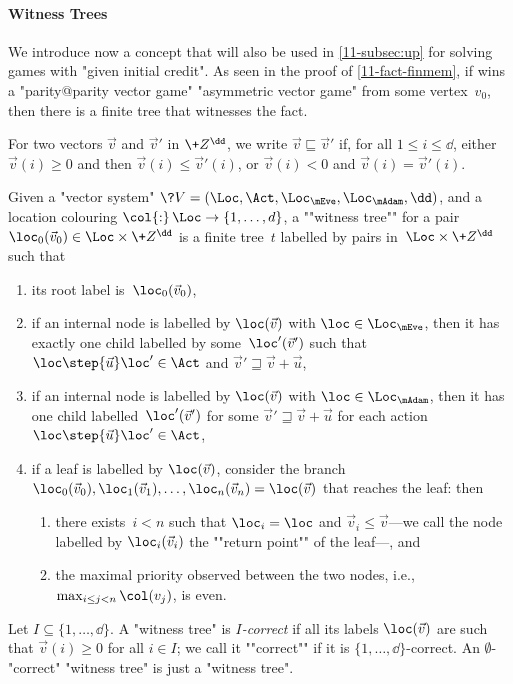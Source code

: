 
\paragraph{Witness Trees}
We introduce now a concept that will also be used in \cref{11-subsec:up}
for solving games with "given initial credit".  As seen in the proof
of \cref{11-fact-finmem}, if \Eve wins a "parity@parity vector game"
"asymmetric vector game" from some vertex~$v_0$, then there is a
finite tree that witnesses the fact.

For two vectors $\vec v$ and $\vec v'$ in $\+Z^\dd$, we write $\vec
v\sqsubseteq \vec v'$ if, for all $1\leq i\leq\dd$, either $\vec
v(i)\geq 0$ and then $\vec v(i)\leq\vec v'(i)$, or $\vec v(i)<0$ and
$\vec v(i)=\vec v'(i)$.

\begin{definition}\label{11-def-wt}
  Given a "vector system"
  $\?V=(\Loc,\Act,\Loc_\mEve,\Loc_\mAdam,\dd)$, and a location
  colouring $\col{:}\,\Loc\to\{1,\dots,d\}$, a ""witness tree"" for a
  pair $\loc_0(\vec v_0)\in\Loc\times\+Z^\dd$ is a finite tree~$t$
  labelled by pairs in~$\Loc\times\+Z^\dd$ such that
\begin{enumerate}
\item its root label is~$\loc_0(\vec v_0)$,
\item if an internal node is labelled by $\loc(\vec v)$ with
  $\loc\in\Loc_\mEve$, then it has exactly one child labelled by
  some~$\loc'(\vec v')$ such that $\loc\step{\vec u}\loc'\in\Act$ and
  $\vec v'\sqsupseteq\vec v+\vec u$,
\item if an internal node is labelled by $\loc(\vec v)$ with
  $\loc\in\Loc_\mAdam$, then it has one child labelled~$\loc'(\vec
  v')$ for some $\vec v'\sqsupseteq\vec v+\vec u$ for each action
  $\loc\step{\vec u}\loc'\in\Act$,
\item\label{11-wt-self-even} if a leaf is labelled by $\loc(\vec v)$,
  consider the branch
  $\loc_0(\vec v_0),\loc_1(\vec v_1),\dots,\loc_n(\vec v_n)=\loc(\vec
  v)$ that reaches the leaf: then
  \begin{enumerate}
  \item\label{11-wt-self}there exists~$i<n$ such that
  $\loc_i=\loc$ and $\vec v_i\leq\vec v$---we call the node labelled by
  $\loc_i(\vec v_i)$ the ""return point"" of the leaf---, and
  \item\label{11-wt-even} the maximal priority observed between the two
  nodes, i.e., $\max_{i\leq j<n}\col(v_j)$, is even.
  \end{enumerate}
\end{enumerate}
\AP Let $I\subseteq \{1,\dots,\dd\}$.  A "witness tree" is
\emph{$I$-correct} if all its labels $\loc(\vec v)$ are such that
$\vec v(i)\geq 0$ for all $i\in I$; we call it ""correct"" if it is
$\{1,\dots,\dd\}$-correct.  An $\emptyset$-"correct" "witness tree" is
just a "witness tree".
\end{definition}

